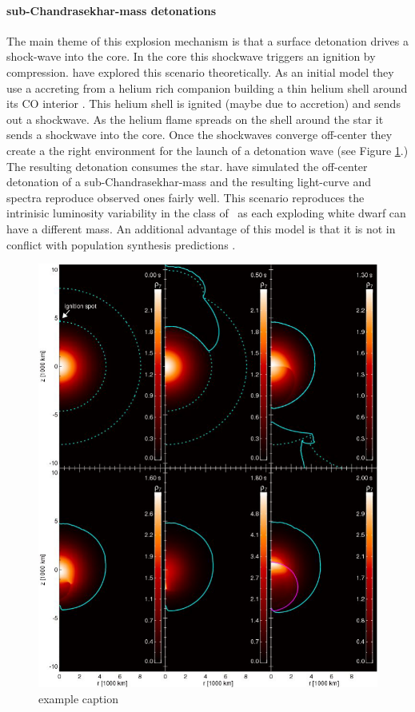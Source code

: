 \paragraph{sub-Chandrasekhar-mass detonations}
The main theme of this explosion mechanism is that a surface detonation drives a shock-wave into the core. In the core this shockwave triggers an ignition by compression. \citet{2010A&A...514A..53F} have explored this scenario theoretically. As an initial model they use a \cowd accreting from a helium rich companion building a thin helium shell around its CO interior \citep[described in][]{2007ApJ...662L..95B}. This helium shell is ignited (maybe due to accretion) and sends out a shockwave. As the helium flame spreads on the shell around the star it sends a shockwave into the core. Once 
the shockwaves converge off-center they create a the right environment for the launch of a detonation wave (see Figure \ref{fig:subch_fink2010}.) 
The resulting detonation consumes the star. \citet{2010ApJ...714L..52S} have simulated the off-center detonation of a sub-Chandrasekhar-mass \cowd and the resulting light-curve and spectra reproduce observed ones fairly well. 
This scenario reproduces the intrinisic luminosity variability in the class of \snia\ as each exploding white dwarf can have a different mass. An additional advantage of this model is that it is not in conflict with population synthesis predictions \citep{2009ApJ...699.2026R}.

\begin{figure}[htbp] %
   \centering
   \includegraphics[width=\textwidth]{chapter1/plots/subchandra_fink2010.pdf} 
   \caption{example caption}
   \label{fig:subch_fink2010}
\end{figure}

